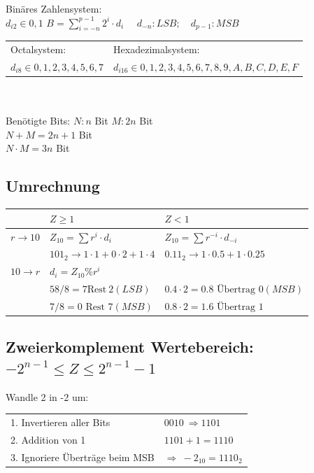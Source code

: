 \documentclass[6pt,a4paper]{scrartcl}
\newcommand{\ra}[0]{\ensuremath{\rightarrow}} 									%
\begin{document}
\begin{multicols}{3}
Binäres Zahlensystem:\\
$d_{i2} \in {0,1}$ \qquad
$B = \sum\limits_{i=-n}^{p-1} 2^i \cdot d_i$ $\quad d_{-n}: LSB; \quad d_{p-1}: MSB$ \\
\begin{tabular}{l|l}
Octalsystem: & Hexadezimalsystem:\\
$d_{i8} \in {0,1,2,3,4,5,6,7}$ & $d_{i16} \in {0,1,2,3,4,5,6,7,8,9,A,B,C,D,E,F}$\\
\end{tabular}\\
\\

Benötigte Bits: $N: n$ Bit  $M: 2n$ Bit \\
$N + M = 2n +1$ Bit \\
$N \cdot M = 3n$ Bit
	\subsection{Umrechnung}
	\begin{tabular}{l|l|l}
			& $Z \ge 1$ & $Z < 1$\\ \midrule
		$r \rightarrow 10$ & $Z_{10} = \sum r^i \cdot d_i$ & $Z_{10} = \sum r^{-i} \cdot d_{-i}$\\
		& $101_2 \ra 1 \cdot 1 + 0\cdot 2 + 1 \cdot 4$ & $0.11_2 \ra 1\cdot 0.5 + 1\cdot 0.25$\\ \midrule
		$10 \rightarrow r$ & $d_i = Z_{10} \% r^i$ & \\
		& $58 / 8 = 7\text{Rest}\ 2 (LSB)$ & $0.4 \cdot 2 = 0.8 \text{ Übertrag } 0 (MSB)$\\
		& $7 / 8 = 0\text{ Rest } 7 (MSB)$ & $0.8 \cdot 2 = 1.6 \text{ Übertrag } 1$ \\
	\end{tabular}

	\subsection{Zweierkomplement \qquad Wertebereich: $-2^{n-1} \le Z \le 2^{n-1} -1$}
	Wandle 2 in -2 um:\\
		\begin{tabular}{l|l}
			1. Invertieren aller Bits  & $0010 \ \Rightarrow 1101$\\
			2. Addition von 1	& $1101 + 1 = 1110$\\
			3. Ignoriere Überträge beim MSB & $\Rightarrow \ -2_{10} = 1110_2$\\
		\end{tabular}

\end{multicols}
\end{document}
